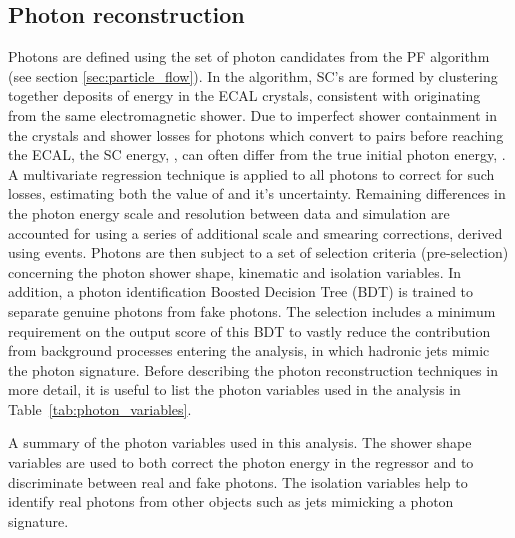 \subsection{Photon reconstruction}\label{sec:photon_reconstruction}
Photons are defined using the set of photon candidates from the PF algorithm (see section \ref{sec:particle_flow}). In the algorithm, SC's are formed by clustering together deposits of energy in the ECAL crystals, consistent with originating from the same electromagnetic shower. Due to imperfect shower containment in the crystals and shower losses for photons which convert to \ee pairs before reaching the ECAL, the SC energy, \Eraw, can often differ from the true initial photon energy, \Etrue. A multivariate regression technique is applied to all photons to correct for such losses, estimating both the value of \Etrue and it's uncertainty. Remaining differences in the photon energy scale and resolution between data and simulation are accounted for using a series of additional scale and smearing corrections, derived using \Zee events. Photons are then subject to a set of selection criteria (pre-selection) concerning the photon shower shape, kinematic and isolation variables. In addition, a photon identification Boosted Decision Tree (BDT) is trained to separate genuine photons from fake photons. The selection includes a minimum requirement on the output score of this BDT to vastly reduce the contribution from background processes entering the analysis, in which hadronic jets mimic the photon signature. Before describing the photon reconstruction techniques in more detail, it is useful to list the photon variables used in the \Hgg analysis in Table~\ref{tab:photon_variables}.

\begin{table}[htb!]
    \caption[Photon variables]{A summary of the photon variables used in this analysis. The shower shape variables are used to both correct the photon energy in the regressor and to discriminate between real and fake photons. The isolation variables help to identify real photons from other objects such as jets mimicking a photon signature.}
    \label{tab:photon_variables}
    \centering
    \scriptsize
    \renewcommand{\arraystretch}{2}
    \hspace*{-1.5cm}
    
    \hspace*{-1.5cm}
\end{table}

